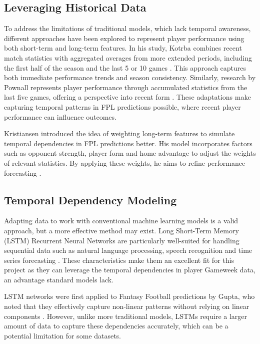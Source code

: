 \subsection{Leveraging Historical Data}

To address the limitations of traditional models, which lack temporal awareness, different approaches have been explored to represent player performance using both short-term and long-term features. In his study, Kotrba combines recent match statistics with aggregated averages from more extended periods, including the first half of the season and the last 5 or 10 games \cite{KotrbaVojtech2020Hifs}. This approach captures both immediate performance trends and season consistency. Similarly, research by Pownall represents player performance through accumulated statistics from the last five games, offering a perspective into recent form \cite{pownall2023fantasyfootball}. These adaptations make capturing temporal patterns in FPL predictions possible, where recent player performance can influence outcomes.

Kristiansen introduced the idea of weighting long-term features to simulate temporal dependencies in FPL predictions better. His model incorporates factors such as opponent strength, player form and home advantage to adjust the weights of relevant statistics. By applying these weights, he aims to refine performance forecasting \cite{Kristiansen2024}.

\subsection{Temporal Dependency Modeling}

Adapting data to work with conventional machine learning models is a valid approach, but a more effective method may exist. Long Short-Term Memory (LSTM) Recurrent Neural Networks are particularly well-suited for handling sequential data such as natural language processing, speech recognition and time series forecasting \cite{jaff2023lstm}. These characteristics make them an excellent fit for this project as they can leverage the temporal dependencies in player Gameweek data, an advantage standard models lack.

LSTM networks were first applied to Fantasy Football predictions by Gupta, who noted that they effectively capture non-linear patterns without relying on linear components \cite{GuptaAkhil2019TSMf}. However, unlike more traditional models, LSTMs require a larger amount of data to capture these dependencies accurately, which can be a potential limitation for some datasets.


